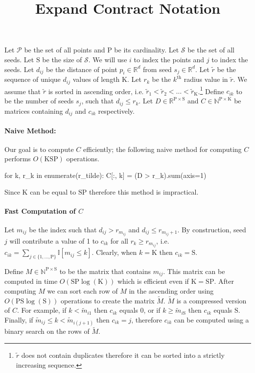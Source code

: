 \documentclass[14pt]{article}
\title{\vspace{-6em}Expand Contract Notation}
\author{}
\date{}
\renewcommand{\th}[1]{$#1^{\textrm{th}}$}
\newcommand{\tr}[0]{\tilde{r}}
\newcommand{\tM}[0]{\tilde{M}}
\newcommand{\tm}[0]{\tilde{m}}
\newcommand{\rmP}[0]{\mathrm{P}}
\newcommand{\rmK}[0]{\mathrm{K}}
\newcommand{\rmS}[0]{\mathrm{S}}
\begin{document}
\maketitle
Let $\mathcal{P}$ be the set of all points and $\rmP$ be its cardinality.
Let $\mathcal{S}$ be the set of all seeds.
Let $\rmS$ be the size of $\mathcal{S}$.
We will use  $i$ to index the points and $j$ to index the seeds.
Let $d_{ij}$ be the distance of point $p_i \in \mathbb{R}^d$ from
seed $s_j \in \mathbb{R}^d$.
Let $\tr$ be the sequence of unique $d_{ij}$ values of length $\rmK$.
Let $r_k$ be the \th{k} radius value in $\tr$. We assume that $\tr$
is sorted in ascending order, i.e. $\tr_1 < \tr_2 < \ldots < \tr_{\rmK}$.\footnote{$\tr$ does not contain duplicates therefore it can be sorted into a strictly increasing sequence.}
Define $c_{ik}$ to be the number of seeds $s_j$, such that $d_{ij} \le r_k$.
Let $D \in \mathbb{R}^{\rmP \times \rmS}$ and
$C \in \mathbb{N}^{\rmP \times \rmK}$ be matrices containing
$d_{ij}$ and $c_{ik}$ respectively.

\paragraph{Naive Method:}
Our goal is to compute $C$ efficiently; the following naive method
for computing $C$ performs $O(\rmK\rmS\rmP)$ operations.
\begin{python}
  for k, r_k in enumerate(r_tilde):
      C[:, k] = (D > r_k).sum(axis=1)
\end{python}
Since $\rmK$ can be equal to $\mathrm{SP}$ therefore this method is impractical.

\paragraph{Fast Computation of $C$}
Let $m_{ij}$ be the index such that $d_{ij} > r_{m_{ij}}$ and $d_{ij} \le r_{m_{ij} + 1}$.
By construction, seed $j$ will contribute a value of 1 to $c_{ik}$ for all
$r_k \ge r_{m_{ij}}$, i.e. $c_{ik}  = \sum_{j \in \{1, \ldots, \rmP\}} \mathbb{I}[m_{ij} \le k]$. Clearly, when $k=\rmK$ then $c_{ik} = \rmS$.

Define $M \in \mathbb{N}^{\rmP \times \rmS}$ to be the matrix that contains
$m_{ij}$. This matrix can be computed in time $O(\rmS\rmP\log(\rmK))$ which is efficient even if $\rmK = \rmS \rmP$. After computing $M$ we can sort each
row of $M$ in the ascending order using $O(\rmP\rmS\log(\rmS))$
operations to create the matrix $\tM$.
$\tM$ is a compressed version of $C$. For example, if $k < \tm_{i1}$
then $c_{ik}$ equals $0$, or if $k \ge \tm_{i\rmS}$ then $c_{ik}$ equals
$\rmS$. Finally, if $\tm_{ij} \le k < \tm_{i (j+1)}$ then $c_{ik} = j$, therefore
$c_{ik}$ can be computed using a binary search on the rows of $\tM$.
\end{document}
